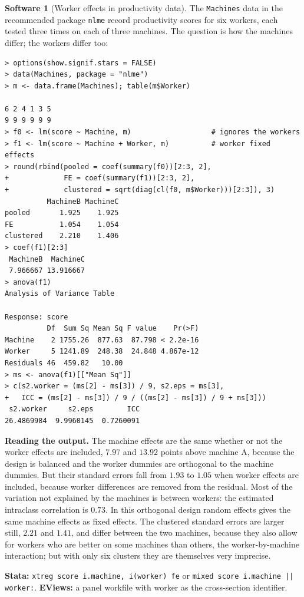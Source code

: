 \documentclass[11pt,a4paper]{article}
\numberwithin{equation}{section}
\theoremstyle{definition}
\newtheorem{software}[thm]{Software}
\begin{document}
\begin{software}[Worker effects in productivity data]
\label{sw:machines}
The \texttt{Machines} data in the recommended package \texttt{nlme} record productivity scores for six workers, each tested three times on each of three
machines. The question is how the machines differ; the workers differ too:
{\small\begin{verbatim}
> options(show.signif.stars = FALSE)
> data(Machines, package = "nlme")
> m <- data.frame(Machines); table(m$Worker)

6 2 4 1 3 5 
9 9 9 9 9 9 
> f0 <- lm(score ~ Machine, m)                   # ignores the workers
> f1 <- lm(score ~ Machine + Worker, m)          # worker fixed effects
> round(rbind(pooled = coef(summary(f0))[2:3, 2],
+             FE = coef(summary(f1))[2:3, 2],
+             clustered = sqrt(diag(cl(f0, m$Worker)))[2:3]), 3)
          MachineB MachineC
pooled       1.925    1.925
FE           1.054    1.054
clustered    2.210    1.406
> coef(f1)[2:3]
 MachineB  MachineC 
 7.966667 13.916667 
> anova(f1)
Analysis of Variance Table

Response: score
          Df  Sum Sq Mean Sq F value    Pr(>F)
Machine    2 1755.26  877.63  87.798 < 2.2e-16
Worker     5 1241.89  248.38  24.848 4.867e-12
Residuals 46  459.82   10.00                  
> ms <- anova(f1)[["Mean Sq"]]
> c(s2.worker = (ms[2] - ms[3]) / 9, s2.eps = ms[3],
+   ICC = (ms[2] - ms[3]) / 9 / ((ms[2] - ms[3]) / 9 + ms[3]))
 s2.worker     s2.eps        ICC 
26.4869984  9.9960145  0.7260091 
\end{verbatim}}
\textbf{Reading the output.} The machine effects are the same whether or not the worker effects are included, $7.97$ and $13.92$ points above machine A, because the
design is balanced and the worker dummies are orthogonal to the machine dummies. But their standard errors fall from $1.93$ to $1.05$ when worker
effects are included, because worker differences are removed from the residual. Most of the variation not explained by the machines is between
workers: the estimated intraclass correlation is $0.73$. In this orthogonal design random effects gives the same machine effects as fixed effects. The
clustered standard errors are larger still, $2.21$ and $1.41$, and differ between the two machines, because they also allow for workers who are
better on some machines than others, the worker-by-machine interaction; but with only six clusters they are themselves very imprecise.

\textbf{Stata:} \texttt{xtreg score i.machine, i(worker) fe} or \texttt{mixed score i.machine || worker:}. \textbf{EViews:} a panel workfile with worker as
the cross-section identifier.
\end{software}
\end{document}
